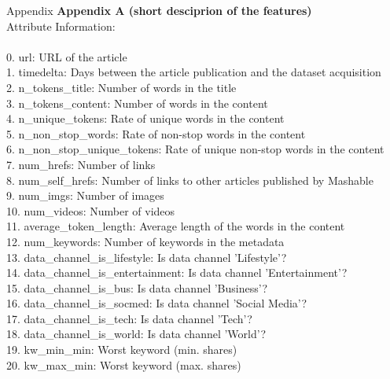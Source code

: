 \documentclass[a4paper,11pt]{article}
\begin{document}
\clearpage
\begin{section}{Appendix}
\textbf{Appendix A (short desciprion of the features)}\\
 Attribute Information:\\\\
     0. url:                    URL of the article\\
     1. timedelta:                  Days between the article publication and the dataset acquisition\\
     2. n\_tokens\_title:              Number of words in the title\\
     3. n\_tokens\_content:              Number of words in the content\\
     4. n\_unique\_tokens:               Rate of unique words in the content\\
     5. n\_non\_stop\_words:              Rate of non-stop words in the content\\
     6. n\_non\_stop\_unique\_tokens:      Rate of unique non-stop words in the content\\
     7. num\_hrefs:                     Number of links\\
     8. num\_self\_hrefs:                Number of links to other articles published by Mashable\\
     9. num\_imgs:                      Number of images\\
    10. num\_videos:                    Number of videos\\
    11. average\_token\_length:          Average length of the words in the content\\
    12. num\_keywords:                  Number of keywords in the metadata\\
    13. data\_channel\_is\_lifestyle:     Is data channel 'Lifestyle'?\\
    14. data\_channel\_is\_entertainment: Is data channel 'Entertainment'?\\
    15. data\_channel\_is\_bus:           Is data channel 'Business'?\\
    16. data\_channel\_is\_socmed:        Is data channel 'Social Media'?\\
    17. data\_channel\_is\_tech:          Is data channel 'Tech'?\\
    18. data\_channel\_is\_world:         Is data channel 'World'?\\
    19. kw\_min\_min:                    Worst keyword (min. shares)\\
    20. kw\_max\_min:                    Worst keyword (max. shares)\\

\end{section}
\end{document}

